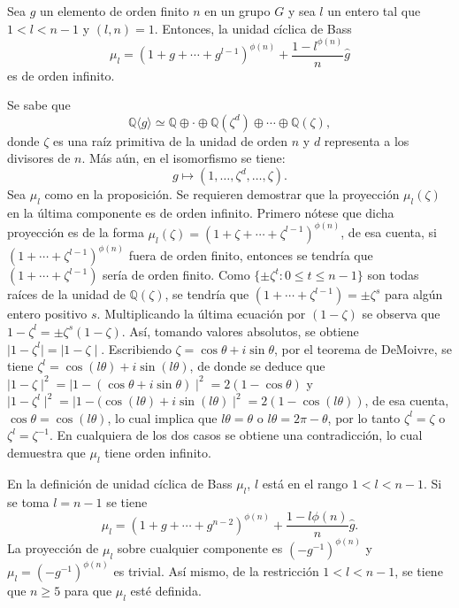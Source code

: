 \begin{proposicion}\label{prop:basscyclic}
Sea $g$ un elemento de orden finito $n$ en un grupo $G$ y sea $l$ un entero tal que $1<l<n-1$ y $(l,n) = 1$. Entonces, la unidad cíclica de Bass \[  \mu_l  = (1+g+\cdots+g^{l-1})^{\phi(n)} + \frac{1-l^{\phi(n)}}{n}\hat{g} \] es de orden infinito. 
\end{proposicion}
\begin{proof*}
Se sabe que \[ \mathds{Q}\langle g \rangle \simeq \mathds{Q} \oplus \cdot \oplus \mathds{Q}(\zeta^d) \oplus \cdots \oplus \mathds{Q}(\zeta),\] donde $\zeta$ es una raíz primitiva de la unidad de orden $n$ y $d$ representa a los divisores de $n$. Más aún, en el isomorfismo se tiene: \[ g \mapsto (1, \dots , \zeta^d, \dots , \zeta).\] Sea $\mu_l$ como en la proposición. Se requieren demostrar que la proyección $\mu_l(\zeta)$ en la última componente es de orden infinito. Primero nótese que dicha proyección  es de la forma $\mu_l(\zeta) = (1+\zeta+\cdots+\zeta^{l-1})^{\phi(n)}$, de esa cuenta, si $(1+\cdots + \zeta^{l-1})^{\phi(n)}$ fuera de orden finito, entonces se tendría que $(1+\cdots + \zeta^{l-1})$ sería de orden finito. Como $\{ \pm \zeta^t \colon 0\leq t\leq n-1 \}$ son todas raíces de la unidad de $\mathds{Q}(\zeta)$, se tendría que $(1+\cdots +\zeta^{l-1}) = \pm \zeta^s$ para algún entero positivo $s$. Multiplicando la última ecuación por $(1-\zeta)$ se observa que $1-\zeta^l = \pm \zeta^s(1-\zeta)$. Así, tomando valores absolutos, se obtiene $\mid 1 - \zeta^l \mid = \mid 1-\zeta \mid$. Escribiendo $\zeta = \cos \theta + i \sin \theta$, por el teorema de DeMoivre, se tiene $\zeta^l = \cos(l\theta) + i \sin(l\theta)$, de donde se deduce que $\mid 1 - \zeta \mid^2 = \mid 1 - (\cos\theta + i \sin\theta) \mid ^2 = 2(1-\cos\theta)$ y $\mid 1-\zeta^l \mid^2 = \mid 1-(\cos(l\theta) + i\sin(l\theta)  \mid^2 = 2(1-\cos(l\theta))$, de esa cuenta, $\cos\theta = \cos (l\theta)$, lo cual implica que $l\theta = \theta$ o $l\theta = 2\pi-\theta$, por lo tanto $\zeta^l = \zeta$ o $\zeta^l = \zeta^{-1}$. En cualquiera de los dos casos se obtiene una contradicción, lo cual demuestra que $\mu_l$ tiene orden infinito.
\end{proof*}
\begin{nota}
En la definición de unidad cíclica de Bass $\mu_l$, $l$ está en el rango $1<l<n-1$. Si se toma $l=n-1$ se tiene \[ \mu_l= (1+g+\cdots+g^{n-2})^{\phi(n)}+\frac{1-l {\phi(n)}}{n}\hat{g}.\] La proyección de $\mu_l$ sobre cualquier componente es $(-g^{-1})^{\phi(n)}$ y $\mu_l = (-g^{-1})^{\phi(n)}$ es trivial. Así mismo, de la restricción $1<l<n-1$, se tiene que $n\geq 5$ para que $\mu_l$ esté definida.
\end{nota}
